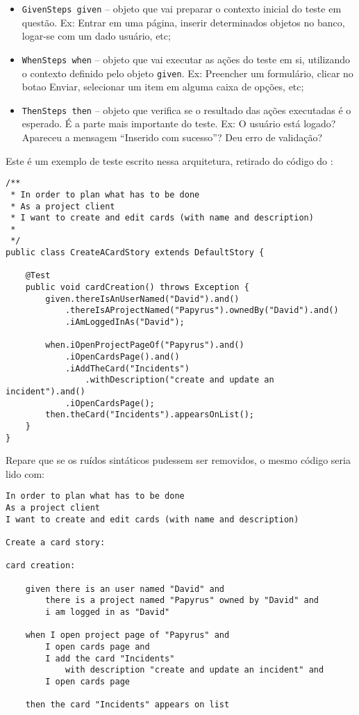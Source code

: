 \begin{itemize}
	\item{\texttt{GivenSteps given} -- objeto que vai preparar o contexto inicial do teste em questão. Ex: Entrar em uma página, inserir determinados objetos no banco, logar-se com um dado usuário, etc;}
	\item{\texttt{WhenSteps when} -- objeto que vai executar as ações do teste em si, utilizando o contexto definido pelo objeto \texttt{given}. Ex: Preencher um formulário, clicar no botao Enviar, selecionar um item em alguma caixa de opções, etc;}
	\item{\texttt{ThenSteps then} -- objeto que verifica se o resultado das ações executadas é o esperado. É a parte mais importante do teste. Ex: O usuário está logado? Apareceu a mensagem ``Inserido com sucesso''? Deu erro de validação?}
\end{itemize}

Este é um exemplo de teste escrito nessa arquitetura, retirado do código do \calopsita{}:

\begin{lstlisting}
/**
 * In order to plan what has to be done
 * As a project client
 * I want to create and edit cards (with name and description)
 *
 */
public class CreateACardStory extends DefaultStory {

	@Test
	public void cardCreation() throws Exception {
		given.thereIsAnUserNamed("David").and()
			.thereIsAProjectNamed("Papyrus").ownedBy("David").and()
			.iAmLoggedInAs("David");

		when.iOpenProjectPageOf("Papyrus").and()
		    .iOpenCardsPage().and()
			.iAddTheCard("Incidents")
				.withDescription("create and update an incident").and()
			.iOpenCardsPage();
		then.theCard("Incidents").appearsOnList();
	}
}
\end{lstlisting}

Repare que se os ruídos sintáticos pudessem ser removidos, o mesmo código seria lido com:

\begin{verbatim}
In order to plan what has to be done
As a project client
I want to create and edit cards (with name and description)

Create a card story:

card creation:
	
	given there is an user named "David" and
		there is a project named "Papyrus" owned by "David" and
		i am logged in as "David"

	when I open project page of "Papyrus" and
		I open cards page and
		I add the card "Incidents" 
			with description "create and update an incident" and
		I open cards page
			
	then the card "Incidents" appears on list
\end{verbatim}


